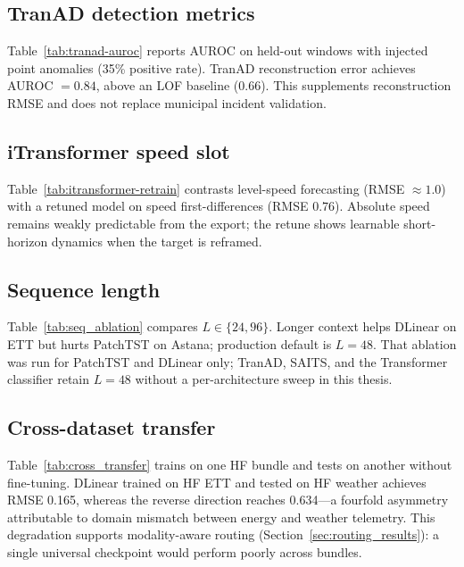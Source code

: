\subsection{TranAD detection metrics}

Table~\ref{tab:tranad-auroc} reports AUROC on held-out windows with injected point anomalies (35\% positive rate). TranAD reconstruction error achieves AUROC $= 0.84$, above an LOF baseline ($0.66$). This supplements reconstruction RMSE and does not replace municipal incident validation.

\subsection{iTransformer speed slot}

Table~\ref{tab:itransformer-retrain} contrasts level-speed forecasting (RMSE $\approx 1.0$) with a retuned model on speed first-differences (RMSE $0.76$). Absolute speed remains weakly predictable from the export; the retune shows learnable short-horizon dynamics when the target is reframed.





\subsection{Sequence length}

Table~\ref{tab:seq_ablation} compares $L\in\{24,96\}$. Longer context helps DLinear on ETT but hurts PatchTST on Astana; production default is $L=48$. That ablation was run for PatchTST and DLinear only; TranAD, SAITS, and the Transformer classifier retain $L{=}48$ without a per-architecture sweep in this thesis.

\subsection{Cross-dataset transfer}

Table~\ref{tab:cross_transfer} trains on one HF bundle and tests on another without fine-tuning. DLinear trained on HF ETT and tested on HF weather achieves RMSE 0.165, whereas the reverse direction reaches 0.634---a fourfold asymmetry attributable to domain mismatch between energy and weather telemetry. This degradation supports modality-aware routing (Section~\ref{sec:routing_results}): a single universal checkpoint would perform poorly across bundles.

